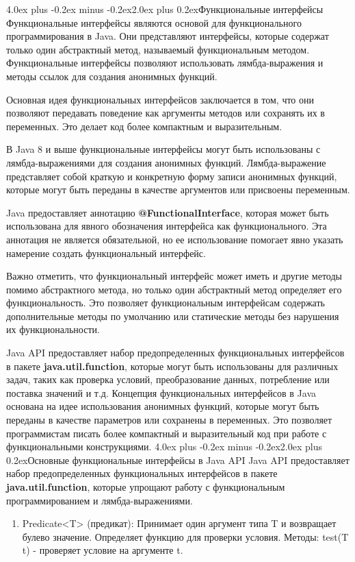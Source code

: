 \documentclass[12pt, a4paper]{book}%
\makeatletter
\renewcommand{\section}{\@startsection{section}{1}{1pt}%
{4.0ex plus -0.2ex minus -0.2ex}{2.0ex plus 0.2ex}{\centering\bf}}%
\makeatother
\begin{document}
{\section{Функциональные интерфейсы}
Функциональные интерфейсы являются основой для функционального программирования в Java. Они представляют интерфейсы, которые содержат только один абстрактный метод, называемый функциональным методом. Функциональные интерфейсы позволяют использовать лямбда-выражения и методы ссылок для создания анонимных функций.

Основная идея функциональных интерфейсов заключается в том, что они позволяют передавать поведение как аргументы методов или сохранять их в переменных. Это делает код более компактным и выразительным.

В Java 8 и выше функциональные интерфейсы могут быть использованы с лямбда-выражениями для создания анонимных функций. Лямбда-выражение представляет собой краткую и конкретную форму записи анонимных функций, которые могут быть переданы в качестве аргументов или присвоены переменным.

Java предоставляет аннотацию {\bf @FunctionalInterface}, которая может быть использована для явного обозначения интерфейса как функционального. Эта аннотация не является обязательной, но ее использование помогает явно указать намерение создать функциональный интерфейс.

Важно отметить, что функциональный интерфейс может иметь и другие методы помимо абстрактного метода, но только один абстрактный метод определяет его функциональность. Это позволяет функциональным интерфейсам содержать дополнительные методы по умолчанию или статические методы без нарушения их функциональности.

Java API предоставляет набор предопределенных функциональных интерфейсов в пакете {\bf java.util.function}, которые могут быть использованы для различных задач, таких как проверка условий, преобразование данных, потребление или поставка значений и т.д.
Концепция функциональных интерфейсов в Java основана на идее использования анонимных функций, которые могут быть переданы в качестве параметров или сохранены в переменных. Это позволяет программистам писать более компактный и выразительный код при работе с функциональными конструкциями.
\section{Основные функциональные интерфейсы в Java API}
Java API предоставляет набор предопределенных функциональных интерфейсов в пакете {\bf java.util.function}, которые упрощают работу с функциональным программированием и лямбда-выражениями. 
\begin{enumerate} 
\item Predicate<T> (предикат): Принимает один аргумент типа T и возвращает булево значение. Определяет функцию для проверки условия. Методы: test(T t) - проверяет условие на аргументе t.


\end{enumerate}}
\end{document}

